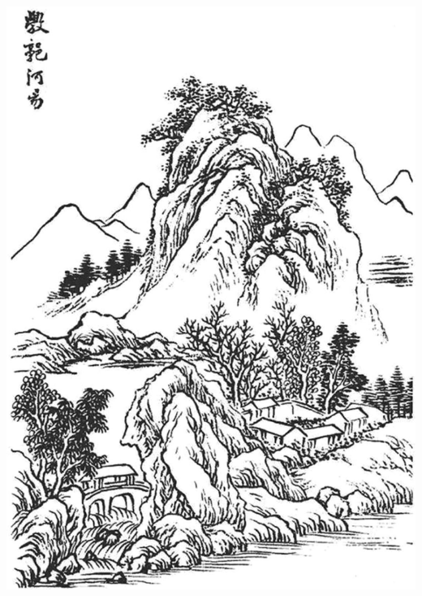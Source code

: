 \documentclass{zhvt-classic}
\begin{document}
\hfil \includegraphics[angle=90]{paint02}
\clearpage
\end{document}
